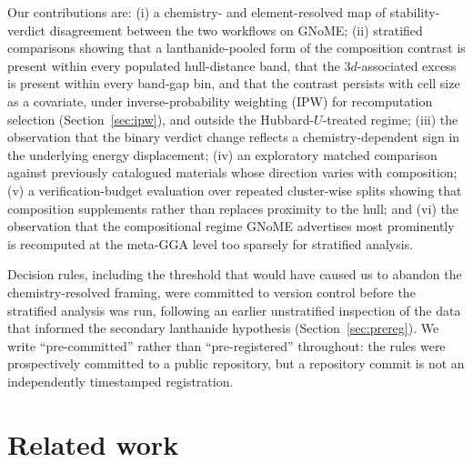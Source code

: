 \documentclass[11pt]{article}
\begin{document}
Our contributions are: (i) a chemistry- and element-resolved map of stability-verdict
disagreement between the two workflows on GNoME; (ii) stratified comparisons showing that a lanthanide-pooled form of the composition
contrast is present within every populated hull-distance band, that the 3$d$-associated excess is
present within every band-gap bin, and that the contrast persists with cell size as a
covariate, under inverse-probability weighting (IPW) for recomputation selection
(Section~\ref{sec:ipw}), and outside the Hubbard-$U$-treated regime; (iii) the observation that the binary verdict change
reflects a chemistry-dependent sign in the underlying energy displacement; (iv) an
exploratory matched comparison against previously catalogued materials whose direction
varies with composition; (v) a verification-budget evaluation over repeated cluster-wise
splits showing that composition supplements rather than replaces proximity to the hull;
and (vi) the observation that the compositional regime GNoME advertises most prominently
is recomputed at the meta-GGA level too sparsely for stratified analysis.

Decision rules, including the threshold that would have caused us to abandon the
chemistry-resolved framing, were committed to version control before the stratified
analysis was run, following an earlier unstratified inspection of the data that informed
the secondary lanthanide hypothesis (Section~\ref{sec:prereg}). We write
``pre-committed'' rather than ``pre-registered'' throughout: the rules were prospectively
committed to a public repository, but a repository commit is not an independently
timestamped registration.

\section{Related work}
\end{document}
